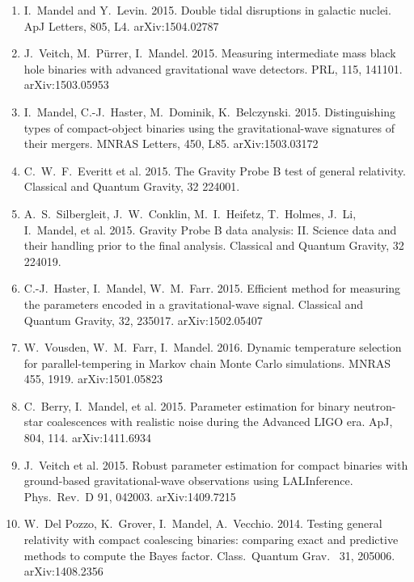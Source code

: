 \documentclass[margin,line]{res}
\begin{document}
\begin{resume}
\begin{enumerate}
\item  I.~Mandel and Y.~Levin.  2015.  Double tidal disruptions in galactic nuclei.  ApJ Letters, 805, L4.  arXiv:1504.02787

\item  J.~Veitch, M.~P\"urrer, I.~Mandel. 2015. Measuring intermediate mass black hole binaries with advanced gravitational wave detectors. PRL, 115, 141101. arXiv:1503.05953 

\item  I.~Mandel, C.-J.~Haster, M.~Dominik, K.~Belczynski.  2015.  Distinguishing types of compact-object binaries using the gravitational-wave signatures of their mergers.  MNRAS Letters, 450, L85. arXiv:1503.03172

\item C.~W.~F.~Everitt et al.  2015.  The Gravity Probe B test of general relativity.  Classical and Quantum Gravity, 32 224001.

\item A.~S.~Silbergleit, J.~W.~Conklin, M.~I.~Heifetz, T.~Holmes, J.~Li, I.~Mandel, et al. 2015.
Gravity Probe B data analysis: II. Science data and their handling prior to the final analysis.  Classical and Quantum Gravity, 32 224019.

\item  C.-J.~Haster, I.~Mandel,  W.~M.~Farr.  2015.  Efficient method for measuring the parameters encoded in a gravitational-wave signal.  Classical and Quantum Gravity, 32, 235017. arXiv:1502.05407

\item W.~Vousden, W.~M.~Farr, I.~Mandel.  2016. Dynamic temperature selection for parallel-tempering in Markov chain Monte Carlo simulations.  MNRAS 455, 1919. arXiv:1501.05823 

\item  C.~Berry, I.~Mandel, et al. 2015. Parameter estimation for binary neutron-star coalescences with realistic noise during the Advanced LIGO era.  ApJ, 804, 114.  arXiv:1411.6934

\item  J.~Veitch et al. 2015. Robust parameter estimation for compact binaries with ground-based gravitational-wave observations using LALInference. Phys.~Rev.~D 91, 042003. arXiv:1409.7215

\item  W.~Del Pozzo, K.~Grover, I.~Mandel, A.~Vecchio. 2014.  Testing general relativity with compact coalescing binaries: comparing exact and predictive methods to compute the Bayes factor. Class.~Quantum Grav.~ 31, 205006. arXiv:1408.2356


\end{enumerate}
\end{resume}
\end{document}
